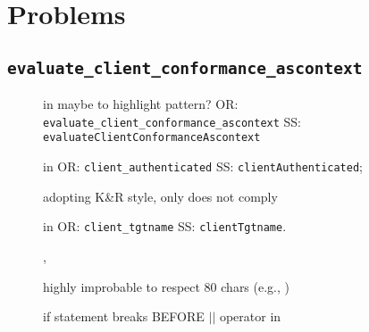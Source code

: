 \chapter{Problems}




\section{\normalfont\texttt{evaluate\_client\_conformance\_ascontext}}


\lipsum[3]


\begin{description}
	\item []
		in  maybe to highlight pattern? 
			OR: \texttt{evaluate\_client\_conformance\_ascontext}
			SS: \texttt{evaluateClientConformanceAscontext}
	\item []
		in  
			OR: \texttt{client\_authenticated}
			SS: \texttt{clientAuthenticated}; 
			\item []
		adopting K\&R style, only  does not comply
\end{description}





\lipsum[1]



\lipsum[2]





\begin{description}
	\item []
		in  
			OR: \texttt{client\_tgtname}
			SS: \texttt{clientTgtname}.
	\item [] 
		, 
	\item []
		highly improbable to respect 80 chars (e.g., )
	\item []
		if statement breaks BEFORE $||$ operator in 
\end{description}


